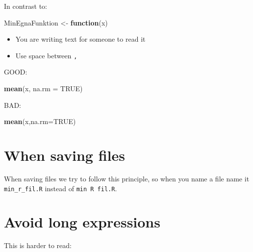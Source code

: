 \documentclass[]{book}
\newenvironment{Shaded}{\begin{snugshade}}{\end{snugshade}}
\newcommand{\ControlFlowTok}[1]{\textcolor[rgb]{0.13,0.29,0.53}{\textbf{#1}}}
\newcommand{\DataTypeTok}[1]{\textcolor[rgb]{0.13,0.29,0.53}{#1}}
\newcommand{\KeywordTok}[1]{\textcolor[rgb]{0.13,0.29,0.53}{\textbf{#1}}}
\newcommand{\NormalTok}[1]{#1}
\newcommand{\OperatorTok}[1]{\textcolor[rgb]{0.81,0.36,0.00}{\textbf{#1}}}
\newcommand{\OtherTok}[1]{\textcolor[rgb]{0.56,0.35,0.01}{#1}}
\newcommand{\StringTok}[1]{\textcolor[rgb]{0.31,0.60,0.02}{#1}}
\providecommand{\tightlist}{%
  \setlength{\itemsep}{0pt}\setlength{\parskip}{0pt}}
\begin{document}
In contrast to:

\begin{Shaded}
\begin{Highlighting}[]
\NormalTok{MinEgnaFunktion <-}\StringTok{ }\ControlFlowTok{function}\NormalTok{(x)}
\end{Highlighting}
\end{Shaded}

\begin{itemize}
\tightlist
\item
  You are writing text for someone to read it
\item
  Use space between \texttt{,}
\end{itemize}

GOOD:

\begin{Shaded}
\begin{Highlighting}[]
\KeywordTok{mean}\NormalTok{(x, }\DataTypeTok{na.rm =} \OtherTok{TRUE}\NormalTok{)}
\end{Highlighting}
\end{Shaded}

BAD:

\begin{Shaded}
\begin{Highlighting}[]
\KeywordTok{mean}\NormalTok{(x,}\DataTypeTok{na.rm=}\OtherTok{TRUE}\NormalTok{)}
\end{Highlighting}
\end{Shaded}

\hypertarget{when-saving-files}{%
\section{When saving files}\label{when-saving-files}}

When saving files we try to follow this principle, so when you name a file name it \texttt{min\_r\_fil.R} instead of \texttt{min\ R\ fil.R}.

\hypertarget{avoid-long-expressions}{%
\section{Avoid long expressions}\label{avoid-long-expressions}}

This is harder to read:

\begin{Shaded}
\end{Shaded}
\end{document}
